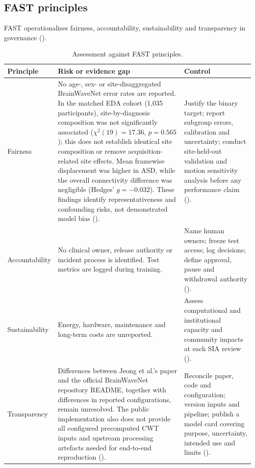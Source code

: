 \documentclass[11pt,a4paper]{article}
\begin{document}
\subsection{FAST principles}
FAST operationalises fairness, accountability, sustainability and transparency in governance (\cite{leslie2019}).

\begin{table}[H]
\centering
\small
\begin{tabularx}{\textwidth}{p{1.8cm}Y Y}
\toprule
\textbf{Principle} & \textbf{Risk or evidence gap} & \textbf{Control} \\
\midrule
Fairness & No age-, sex- or site-disaggregated BrainWaveNet error rates are reported. In the matched EDA cohort (1,035 participants), site-by-diagnosis composition was not significantly associated ($\chi^2(19)=17.36$, $p=0.565$); this does not establish identical site composition or remove acquisition-related site effects. Mean framewise displacement was higher in ASD, while the overall connectivity difference was negligible (Hedges' $g=-0.032$). These findings identify representativeness and confounding risks, not demonstrated model bias (\cite{jeong2024,dimartino2014}). & Justify the binary target; report subgroup errors, calibration and uncertainty; conduct site-held-out validation and motion sensitivity analysis before any performance claim (\cite{abraham2017,mehrabi2021,suresh2021,rajkomar2018,obermeyer2019}). \\
Accountability & No clinical owner, release authority or incident process is identified. Test metrics are logged during training. & Name human owners; freeze test access; log decisions; define approval, pause and withdrawal authority (\cite{raji2020,who2021,gmlp2021}). \\
Sustainability & Energy, hardware, maintenance and long-term costs are unreported. & Assess computational and institutional capacity and community impacts at each SIA review (\cite{leslie2019,who2021}). \\
Transparency & Differences between Jeong et al.'s paper and the official BrainWaveNet repository README, together with differences in reported configurations, remain unresolved. The public implementation also does not provide all configured precomputed CWT inputs and upstream processing artefacts needed for end-to-end reproduction (\cite{brainwavenetcode}). & Reconcile paper, code and configuration; version inputs and pipeline; publish a model card covering purpose, uncertainty, intended use and limits (\cite{mitchell2019,who2021,gmlp2021}). \\
\bottomrule
\end{tabularx}
\caption{Assessment against FAST principles.}
\label{tab:fast}
\end{table}
\end{document}
